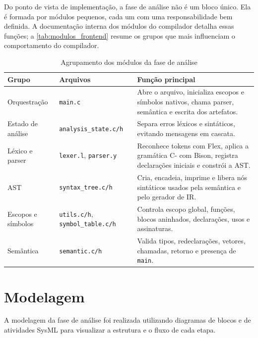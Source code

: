 \documentclass[
	12pt,				%
	oneside,
	a4paper,			%
	english,			%
	french,				%
	spanish,			%
	brazil,				%
	]{abntex2}
\begin{document}
Do ponto de vista de implementação, a fase de análise não é um bloco único. Ela é formada por módulos pequenos, cada um com uma responsabilidade bem definida. A documentação interna dos módulos do compilador detalha essas funções; a \autoref{tab:modulos_frontend} resume os grupos que mais influenciam o comportamento do compilador.

\begin{table}[H]
    \centering
    \ABNTEXfontereduzida
    \caption{Agrupamento dos módulos da fase de análise}
    \label{tab:modulos_frontend}
    \begin{tabular}{|p{}|p{}|p{}|}
        \hline
        \textbf{Grupo} & \textbf{Arquivos} & \textbf{Função principal} \\
        \hline
        Orquestração & \texttt{main.c} & Abre o arquivo, inicializa escopos e símbolos nativos, chama parser, semântica e escrita dos artefatos. \\
        \hline
        Estado de análise & \texttt{analysis\_state.c/h} & Separa erros léxicos e sintáticos, evitando mensagens em cascata. \\
        \hline
        Léxico e parser & \texttt{lexer.l}, \texttt{parser.y} & Reconhece tokens com Flex, aplica a gramática C- com Bison, registra declarações iniciais e constrói a AST. \\
        \hline
        AST & \texttt{syntax\_tree.c/h} & Cria, encadeia, imprime e libera nós sintáticos usados pela semântica e pelo gerador de IR. \\
        \hline
        Escopos e símbolos & \texttt{utils.c/h}, \texttt{symbol\_table.c/h} & Controla escopo global, funções, blocos aninhados, declarações, usos e assinaturas. \\
        \hline
        Semântica & \texttt{semantic.c/h} & Valida tipos, redeclarações, vetores, chamadas, retorno e presença de \texttt{main}. \\
        \hline
    \end{tabular}
\end{table}

\section{Modelagem}

A modelagem da fase de análise foi realizada utilizando diagramas de blocos e de atividades SysML para visualizar a estrutura e o fluxo de cada etapa.
\end{document}
